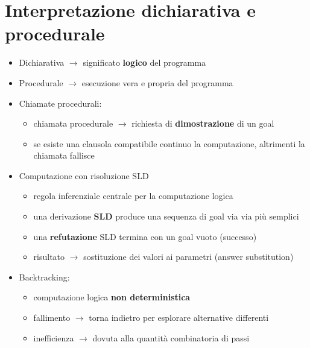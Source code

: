 \documentclass[12pt]{extarticle}
\begin{document}
\section*{Interpretazione dichiarativa e procedurale}
\begin{itemize}
  \item Dichiarativa $\rightarrow$ significato \textbf{logico} del programma
  \item Procedurale $\rightarrow$ esecuzione vera e propria del programma
  \item Chiamate procedurali:
  \begin{itemize}
    \item chiamata procedurale $\rightarrow$ richiesta di \textbf{dimostrazione} di un goal
    \item se esiste una clausola compatibile continuo la computazione, altrimenti la chiamata fallisce
  \end{itemize}
  \item Computazione con risoluzione SLD
  \begin{itemize}
    \item regola inferenziale centrale per la computazione logica
    \item una derivazione \textbf{SLD} produce una sequenza di goal via via più semplici
    \item una \textbf{refutazione} SLD termina con un goal vuoto (successo)
    \item risultato $\rightarrow$ sostituzione dei valori ai parametri (answer substitution)
  \end{itemize}
  \item Backtracking:
  \begin{itemize}
    \item computazione logica \textbf{non deterministica}
    \item fallimento $\rightarrow$ torna indietro per esplorare alternative differenti
    \item inefficienza $\rightarrow$ dovuta alla quantità combinatoria di passi
  \end{itemize}
\end{itemize}
\end{document}
